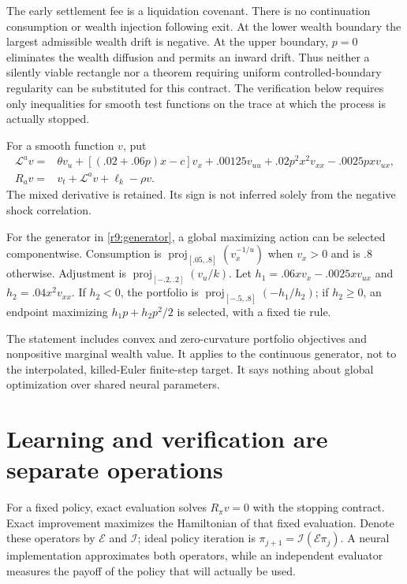 The early settlement fee is a liquidation covenant. There is no continuation consumption or wealth injection following exit. At the lower wealth boundary the largest admissible wealth drift is negative. At the upper boundary, $p=0$ eliminates the wealth diffusion and permits an inward drift. Thus neither a silently viable rectangle nor a theorem requiring uniform controlled-boundary regularity can be substituted for this contract. The verification below requires only inequalities for smooth test functions on the trace at which the process is actually stopped.

For a smooth function $v$, put
\begin{align}
 \mathcal L^av={}&\theta v_u+[(.02+.06p)x-c]v_x
   +.00125v_{uu}+.02p^2x^2v_{xx}-.0025pxv_{ux},\\
 R_av={}&v_t+\mathcal L^av+\ell_k-\rho v.\label{r9:generator}
\end{align}
The mixed derivative is retained. Its sign is not inferred solely from the negative shock correlation.

\begin{proposition}\label{r9:selection}
For the generator in \eqref{r9:generator}, a global maximizing action can be selected componentwise. Consumption is $\operatorname{proj}_{[.05,.8]}(v_x^{-1/u})$ when $v_x>0$ and is $.8$ otherwise. Adjustment is $\operatorname{proj}_{[-.2,.2]}(v_u/k)$. Let $h_1=.06xv_x-.0025xv_{ux}$ and $h_2=.04x^2v_{xx}$. If $h_2<0$, the portfolio is $\operatorname{proj}_{[-.5,.8]}(-h_1/h_2)$; if $h_2\geq0$, an endpoint maximizing $h_1p+h_2p^2/2$ is selected, with a fixed tie rule.
\end{proposition}
The statement includes convex and zero-curvature portfolio objectives and nonpositive marginal wealth value. It applies to the continuous generator, not to the interpolated, killed-Euler finite-step target. It says nothing about global optimization over shared neural parameters.

\section{Learning and verification are separate operations}\label{r9:algorithm}
For a fixed policy, exact evaluation solves $R_\pi v=0$ with the stopping contract. Exact improvement maximizes the Hamiltonian of that fixed evaluation. Denote these operators by $\mathcal E$ and $\mathcal I$; ideal policy iteration is $\pi_{j+1}=\mathcal I(\mathcal E\pi_j)$. A neural implementation approximates both operators, while an independent evaluator measures the payoff of the policy that will actually be used.

